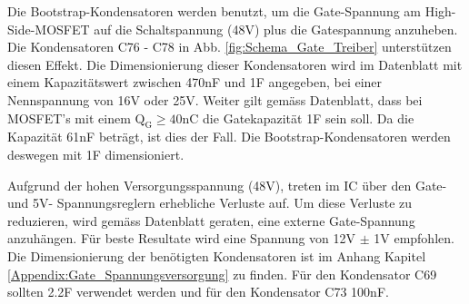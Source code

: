

Die Bootstrap-Kondensatoren werden benutzt, um die Gate-Spannung am High-Side-MOSFET auf die Schaltspannung (48V) plus die Gatespannung anzuheben. Die Kondensatoren C76 - C78 in Abb. \ref{fig:Schema_Gate_Treiber} unterstützen diesen Effekt.
Die Dimensionierung dieser Kondensatoren wird im Datenblatt mit einem Kapazitätswert zwischen 470nF und 1\textmugreek F angegeben, bei einer Nennspannung von 16V oder 25V. Weiter gilt gemäss Datenblatt, dass bei MOSFET's mit einem $\mathrm{Q_G \geq 40nC}$ die Gatekapazität 1\textmugreek F sein soll. Da die Kapazität 61nF beträgt, ist dies der Fall. Die Bootstrap-Kondensatoren werden deswegen mit 1\textmugreek F dimensioniert. \cite[S.10]{trinamicmotion_control_gmbh__co_kg_tmc6200_2019}



Aufgrund der hohen Versorgungsspannung (48V), treten im IC über den Gate- und 5V- Spannungsreglern erhebliche Verluste auf. Um diese Verluste zu reduzieren, wird gemäss Datenblatt \cite[S.11]{trinamicmotion_control_gmbh__co_kg_tmc6200_2019} geraten, eine externe Gate-Spannung anzuhängen. Für beste Resultate wird eine Spannung von 12V $\pm$ 1V empfohlen.
Die Dimensionierung der benötigten Kondensatoren ist im Anhang Kapitel \ref{Appendix:Gate_Spannungsversorgung} zu finden. Für den Kondensator C69 sollten 2.2\textmugreek F verwendet werden und für den Kondensator C73 100nF.

